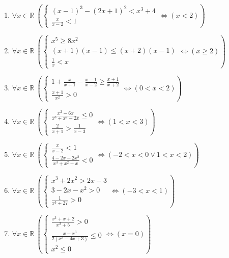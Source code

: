 \documentclass[11pt,a4paper]{article}
\begin{document}
\begin{enumerate}
\item $\displaystyle \forall x \in \mathbb{R}\ \left( \begin{cases} (x - 1)^{3} - (2x + 1)^{2} < x^{3} + 4 \\ \frac{x}{x - 2} < 1 \end{cases} \iff \left( x < 2 \right) \right)$
\item $\displaystyle \forall x \in \mathbb{R}\ \left( \begin{cases} x^{5} \ge 8x^{2} \\ (x + 1)(x - 1) \le (x + 2)(x - 1) \\ \frac{1}{x} < x \end{cases} \iff \left( x \ge 2 \right) \right)$
\item $\displaystyle \forall x \in \mathbb{R}\ \left( \begin{cases} 1 + \frac{x}{x + 1} - \frac{x - 1}{x - 2} \ge \frac{x + 1}{x + 2} \\ \frac{x + 1}{x^{2}} > 0 \end{cases} \iff \left( 0 < x < 2 \right) \right)$
\item $\displaystyle \forall x \in \mathbb{R}\ \left( \begin{cases} \frac{x^{2} - 6x}{x^{3} + x^{2} - 2x} \le 0 \\ \frac{2}{x + 1} > \frac{1}{x - 3} \end{cases} \iff \left( 1 < x < 3 \right) \right)$
\item $\displaystyle \forall x \in \mathbb{R}\ \left( \begin{cases} \frac{x}{x - 2} < 1 \\ \frac{4 - 2x - 2x^{2}}{x^{3} + x^{2} + x} < 0 \end{cases} \iff \left( -2 < x < 0 \lor 1 < x < 2 \right) \right)$
\item $\displaystyle \forall x \in \mathbb{R}\ \left( \begin{cases} x^{3} + 2x^{2} > 2x - 3 \\ 3 - 2x - x^{2} > 0 \\ \frac{1}{x^{3} + 27} > 0 \end{cases} \iff \left( -3 < x < 1 \right) \right)$
\item $\displaystyle \forall x \in \mathbb{R}\ \left( \begin{cases} \frac{x^{3} + x + 2}{x^{2} + 5} > 0 \\ \frac{x - x^{3}}{2(x^{3} - 4x + 3)} \le 0 \\ x^{2} \le 0 \end{cases} \iff \left( x = 0 \right) \right)$

\end{enumerate}
\end{document}
